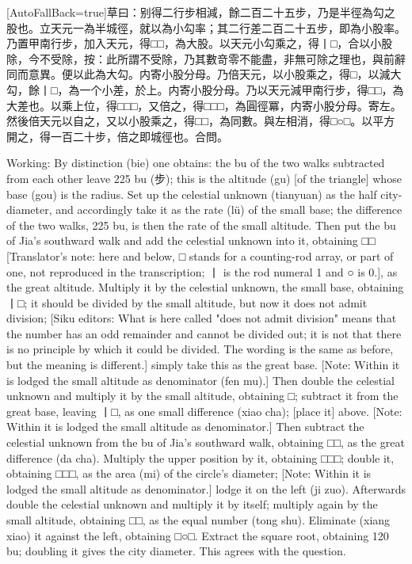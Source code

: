 \documentclass[11pt]{article}
\newcommand{\zhsmall}{\footnotesize\color{black!70}}
\newcommand{\unitlabel}[1]{\marginpar{\raggedleft\tiny\color{gray}#1}}
\newenvironment{unitzh}{\par\CJKfontspec{Noto Serif CJK SC}[AutoFallBack=true]\large\linespread{1.25}\selectfont}{\par}
\newenvironment{uniten}{\par\small\color{black!85}}{\par\medskip}
\begin{document}
\begin{unitzh}\unitlabel{ceyuan-009.1}草曰：别得二行步相減，餘二百二十五步，乃是半徑為勾之股也。立天元一為半城徑，就以為小勾率；其二行差二百二十五步，即為小股率。乃置甲南行步，加入天元，得□□，為大股。以天元小勾乘之，得丨□，合以小股除，今不受除，{\zhsmall 按：此所謂不受除，乃其數竒零不能盡，非無可除之理也，與前辭同而意異。}便以此為大勾。{\zhsmall 内寄小股分母。}乃倍天元，以小股乘之，得□，以減大勾，餘丨□，為一个小差，於上。{\zhsmall 内寄小股分母。}乃以天元減甲南行步，得□□，為大差也。以乘上位，得□□□，又倍之，得□□□，為圓徑冪，{\zhsmall 内寄小股分母。}寄左。然後倍天元以自之，又以小股乘之，得□□，為同數。與左相消，得□○□。以平方開之，得一百二十步，倍之即城徑也。合問。\end{unitzh}
\begin{uniten}Working: By distinction (bie) one obtains: the bu of the two walks subtracted from each other leave 225 bu (步); this is the altitude (gu) [of the triangle] whose base (gou) is the radius. Set up the celestial unknown (tianyuan) as the half city-diameter, and accordingly take it as the rate (lü) of the small base; the difference of the two walks, 225 bu, is then the rate of the small altitude. Then put the bu of Jia's southward walk and add the celestial unknown into it, obtaining □□ [Translator's note: here and below, □ stands for a counting-rod array, or part of one, not reproduced in the transcription; 丨 is the rod numeral 1 and ○ is 0.], as the great altitude. Multiply it by the celestial unknown, the small base, obtaining 丨□; it should be divided by the small altitude, but now it does not admit division; [Siku editors: What is here called "does not admit division" means that the number has an odd remainder and cannot be divided out; it is not that there is no principle by which it could be divided. The wording is the same as before, but the meaning is different.] simply take this as the great base. [Note: Within it is lodged the small altitude as denominator (fen mu).] Then double the celestial unknown and multiply it by the small altitude, obtaining □; subtract it from the great base, leaving 丨□, as one small difference (xiao cha); [place it] above. [Note: Within it is lodged the small altitude as denominator.] Then subtract the celestial unknown from the bu of Jia's southward walk, obtaining □□, as the great difference (da cha). Multiply the upper position by it, obtaining □□□; double it, obtaining □□□, as the area (mi) of the circle's diameter; [Note: Within it is lodged the small altitude as denominator.] lodge it on the left (ji zuo). Afterwards double the celestial unknown and multiply it by itself; multiply again by the small altitude, obtaining □□, as the equal number (tong shu). Eliminate (xiang xiao) it against the left, obtaining □○□. Extract the square root, obtaining 120 bu; doubling it gives the city diameter. This agrees with the question.\end{uniten}
\end{document}
